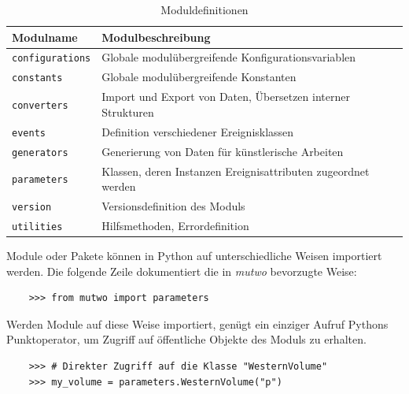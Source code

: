 \documentclass[12pt,a4paper,ngerman]{article}
\begin{document}
\begin{table}[h!]
    \begin{center}
        \begin{tabular}{l l} 
            \hline
            Modulname & Modulbeschreibung \\ [0.5ex] 
            \hline\hline
            \texttt{configurations} & Globale modulübergreifende Konfigurationsvariablen \\
            \texttt{constants} & Globale modulübergreifende Konstanten \\
            \texttt{converters} & Import und Export von Daten, Übersetzen interner Strukturen \\
            \texttt{events} & Definition verschiedener Ereignisklassen \\
            \texttt{generators} & Generierung von Daten für künstlerische Arbeiten \\
            \texttt{parameters} & Klassen, deren Instanzen Ereignisattributen zugeordnet werden \\
            \texttt{version} & Versionsdefinition des Moduls \\
            \texttt{utilities} & Hilfsmethoden, Errordefinition \\ [1ex] 
            \hline
        \end{tabular}\label{table:modulDefinition}
    \end{center}

    \caption{Moduldefinitionen}
\end{table}

Module oder Pakete können in Python auf unterschiedliche Weisen importiert werden.
Die folgende Zeile dokumentiert die in \emph{mutwo} bevorzugte Weise:

\lstset{language=Python}

\begin{lstlisting}
    >>> from mutwo import parameters
\end{lstlisting}

Werden Module auf diese Weise importiert, genügt ein einziger Aufruf Pythons Punktoperator, um Zugriff auf öffentliche Objekte des Moduls zu erhalten.

\lstset{language=Python}

\begin{lstlisting}
    >>> # Direkter Zugriff auf die Klasse "WesternVolume"
    >>> my_volume = parameters.WesternVolume("p")
\end{lstlisting}
\end{document}
